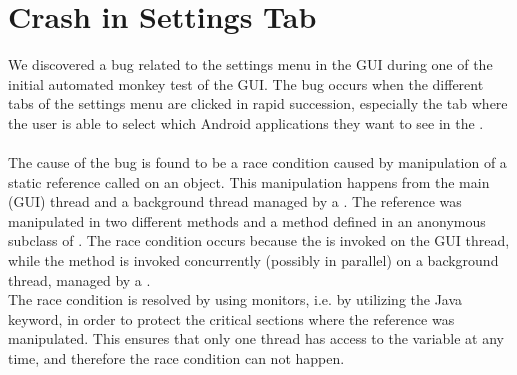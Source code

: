 \section{Crash in Settings Tab}
\label{sec:crash_in_settings_tab}

We discovered a bug related to the settings menu in the \launcher GUI during one of the initial automated monkey test of the GUI. The bug occurs when the different tabs of the settings menu are clicked in rapid succession, especially the tab where the user is able to select which Android applications they want to see in the \giraf \launcher.
\\\\
The cause of the bug is found to be a race condition caused by manipulation of a static reference called  on an  object. This manipulation happens from the main (GUI) thread and a background thread managed by a . The reference was manipulated in two different methods  and a method  defined in an anonymous subclass of . The race condition occurs because the  is invoked on the GUI thread, while the  method is invoked concurrently (possibly in parallel) on a background thread, managed by a . \\

The race condition is resolved by using monitors, i.e. by utilizing the  Java keyword, in order to protect the critical sections where the  reference was manipulated. This ensures that only one thread has access to the variable at any time, and therefore the race condition can not happen.

